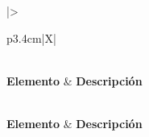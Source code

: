 {\small
\begin{xltabular}{\textwidth}{|>{\raggedright\arraybackslash}p{3.4cm}|X|}
    \caption{Especificación expandida -- CU-03 y CU-04: Gestionar carrito y confirmar pedido}
    \label{tab:cu_expandido_compra} \\
    \hline
    \textbf{Elemento} & \textbf{Descripción} \\
    \hline
    \endfirsthead

     \\
    \hline
    \textbf{Elemento} & \textbf{Descripción} \\
    \hline
    \endhead

     \\
    \endfoot

    \endlastfoot


\end{xltabular}}
